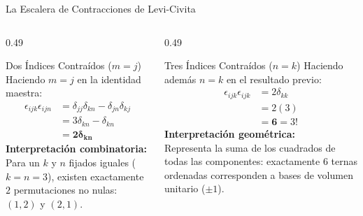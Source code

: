 \documentclass[10pt,aspectratio=169]{beamer}
\begin{document}
\begin{frame}{La Escalera de Contracciones de Levi-Civita}
  \begin{columns}[c]
    \begin{column}{0.49\textwidth}
      \begin{block}{Dos Índices Contraídos ($m = j$)}
        \footnotesize
        Haciendo $m = j$ en la identidad maestra:
        \begin{align*}
          \epsilon_{ijk}\epsilon_{ijn} &= \delta_{jj}\delta_{kn} - \delta_{jn}\delta_{kj} \\
          &= 3\delta_{kn} - \delta_{kn} \\
          &= \mathbf{2\delta_{kn}}
        \end{align*}
        \textbf{Interpretación combinatoria:}\\
        Para un $k$ y $n$ fijados iguales ($k=n=3$), existen exactamente $2$ permutaciones no nulas: $(1, 2)$ y $(2, 1)$.
      \end{block}
    \end{column}
    \begin{column}{0.49\textwidth}
      \begin{block}{Tres Índices Contraídos ($n = k$)}
        \footnotesize
        Haciendo además $n = k$ en el resultado previo:
        \begin{align*}
          \epsilon_{ijk}\epsilon_{ijk} &= 2\delta_{kk} \\
          &= 2(3) \\
          &= \mathbf{6} = 3!
        \end{align*}
        \textbf{Interpretación geométrica:}\\
        Representa la suma de los cuadrados de todas las componentes: exactamente $6$ ternas ordenadas corresponden a bases de volumen unitario ($\pm 1$).
      \end{block}
    \end{column}
  \end{columns}
\end{frame}
\end{document}
